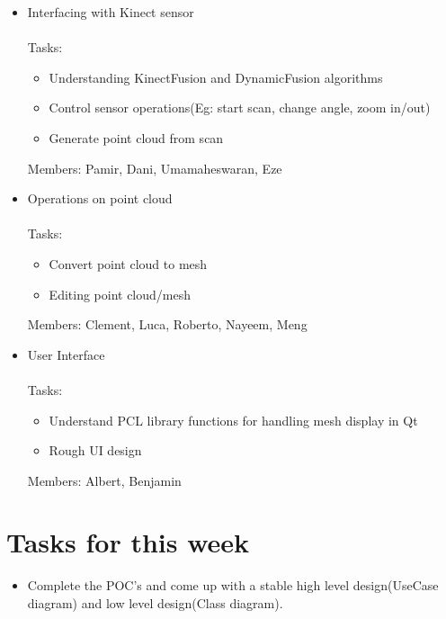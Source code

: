\documentclass[11pt]{article} %
\begin{document}
\begin{itemize}
\item Interfacing with Kinect sensor~\\
~\\Tasks:
\begin{itemize}
\item Understanding KinectFusion and DynamicFusion algorithms
\item  Control sensor operations(Eg: start scan, change angle, zoom in/out)
\item  Generate point cloud from scan
\end{itemize}
Members: Pamir, Dani, Umamaheswaran, Eze

\item Operations on point cloud~\\
~\\Tasks:
\begin{itemize}
\item Convert point cloud to mesh
\item Editing point cloud/mesh
\end{itemize}
Members: Clement, Luca, Roberto, Nayeem, Meng
	

\item User Interface~\\
~\\Tasks:
\begin{itemize}
\item Understand PCL library functions for handling mesh display in Qt
\item Rough UI design
\end{itemize}
Members: Albert, Benjamin
\end{itemize}	

\section{Tasks for this week}
\begin{itemize}
\item Complete the POC's and come up with a stable high level design(UseCase diagram) and low level design(Class diagram).
\end{itemize}
\end{document}

